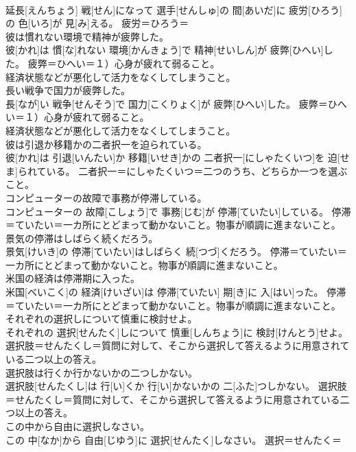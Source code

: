 \documentclass[8pt]{extreport}
\begin{document}
\begin{CJK}{UTF8}{min}
{\\	延長[えんちょう] 戦[せん]になって 選手[せんしゅ]の 間[あいだ]に 疲労[ひろう]の 色[いろ]が 見[み]える。	疲労＝ひろう＝ 
\\	彼は慣れない環境で精神が疲弊した。	
\\	彼[かれ]は 慣[な]れない 環境[かんきょう]で 精神[せいしん]が 疲弊[ひへい]した。	疲弊＝ひへい＝１）心身が疲れて弱ること。 　　　　　　　
\\	経済状態などが悪化して活力をなくしてしまうこと。
\\	長い戦争で国力が疲弊した。	
\\	長[なが]い 戦争[せんそう]で 国力[こくりょく]が 疲弊[ひへい]した。	疲弊＝ひへい＝１）心身が疲れて弱ること。 　　　　　　　
\\	経済状態などが悪化して活力をなくしてしまうこと。
\\	彼は引退か移籍かの二者択一を迫られている。	
\\	彼[かれ]は 引退[いんたい]か 移籍[いせき]かの 二者択一[にしゃたくいつ]を 迫[せま]られている。	二者択一＝にしゃたくいつ＝二つのうち、どちらか一つを選ぶこと。
\\	コンピューターの故障で事務が停滞している。	
\\	コンピューターの 故障[こしょう]で 事務[じむ]が 停滞[ていたい]している。	停滞＝ていたい＝一カ所にとどまって動かないこと。物事が順調に進まないこと。
\\	景気の停滞はしばらく続くだろう。	
\\	景気[けいき]の 停滞[ていたい]はしばらく 続[つづ]くだろう。	停滞＝ていたい＝一カ所にとどまって動かないこと。物事が順調に進まないこと。
\\	米国の経済は停滞期に入った。	
\\	米国[べいこく]の 経済[けいざい]は 停滞[ていたい] 期[き]に 入[はい]った。	停滞＝ていたい＝一カ所にとどまって動かないこと。物事が順調に進まないこと。
\\	それぞれの選択しについて慎重に検討せよ。	
\\	それぞれの 選択[せんたく]しについて 慎重[しんちょう]に 検討[けんとう]せよ。	選択肢＝せんたくし＝質問に対して、そこから選択して答えるように用意されている二つ以上の答え。
\\	選択肢は行くか行かないかの二つしかない。	
\\	選択肢[せんたくし]は 行[い]くか 行[い]かないかの 二[ふた]つしかない。	選択肢＝せんたくし＝質問に対して、そこから選択して答えるように用意されている二つ以上の答え。
\\	この中から自由に選択しなさい。	
\\	この 中[なか]から 自由[じゆう]に 選択[せんたく]しなさい。	選択＝せんたく＝ 
}
\end{CJK}
\end{document}
